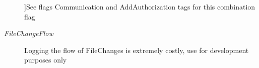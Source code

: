 \begin{Desc}
\begin{description}
{}]See flags Communication and Add\-Authorization tags for this combination flag \item[{\em 
\hypertarget{namespace_cloud_api_public_1_1_static_a7e5ae8f2a85f427de3d6c8a5afcbb029}{File\-Change\-Flow}\label{namespace_cloud_api_public_1_1_static_a7e5ae8f2a85f427de3d6c8a5afcbb029}
}]Logging the flow of File\-Changes is extremely costly, use for development purposes only \end{description}
\end{Desc}

